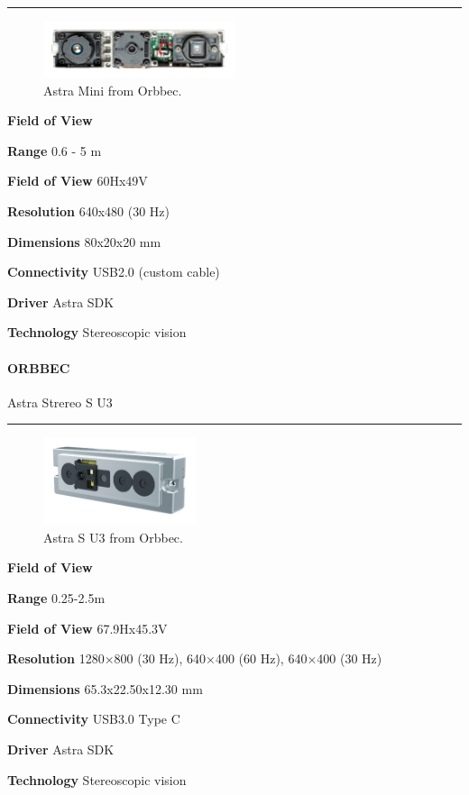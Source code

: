 \documentclass[../main.tex]{subfiles}
\begin{document}
\noindent\rule{8cm}{0.1pt}
\begin{figure}[H]
    \centering
    \includegraphics[width=0.5\textwidth]{images/astra_mini.png}
    \caption{Astra Mini from Orbbec.}
    \label{fig:astra_mini}
\end{figure}
\begin{labeling}{\textbf{Field of View    }}
    \setlength{\itemindent}{2em}
    \item [\textbf{Range}] 0.6 - 5 m
    \item [\textbf{Field of View}] 60Hx49V
    \item [\textbf{Resolution}] 640x480 (30 Hz)
    \item [\textbf{Dimensions}] 80x20x20 mm
    \item [\textbf{Connectivity}] USB2.0 (custom cable)
    \item [\textbf{Driver}] Astra SDK
    \item [\textbf{Technology}] Stereoscopic vision
\end{labeling}
\vspace{1em}
\paragraph{\large \textbf{ORBBEC}} {\large Astra Strereo S U3}

\noindent\rule{8cm}{0.1pt}
\begin{figure}[H]
    \centering
    \includegraphics[width=0.4\textwidth]{images/astra_su3.png}
    \caption{Astra S U3 from Orbbec.}
    \label{fig:astra_mini}
\end{figure}
\begin{labeling}{\textbf{Field of View    }}
    \setlength{\itemindent}{2em}
    \item [\textbf{Range}] 0.25-2.5m
    \item [\textbf{Field of View}] 67.9Hx45.3V
    \item [\textbf{Resolution}] 1280×800 (30 Hz), 640×400 (60 Hz), 640×400 (30 Hz)
    \item [\textbf{Dimensions}] 65.3x22.50x12.30 mm
    \item [\textbf{Connectivity}] USB3.0 Type C
    \item [\textbf{Driver}] Astra SDK
    \item [\textbf{Technology}] Stereoscopic vision
\end{labeling}
\vspace{1em}
\end{document}
